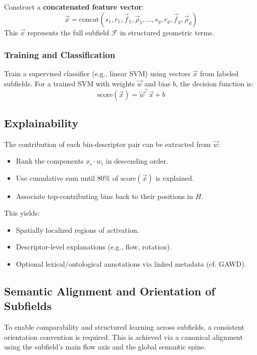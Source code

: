             Construct a \textbf{concatenated feature vector}:
            \[
                \vec{x} = \mathrm{concat}(s_1, r_1, \vec{f}_1, \vec{\rho}_1, \dots, s_g, r_g, \vec{f}_g, \vec{\rho}_g)
            \]
            This $\vec{x}$ represents the full subfield $\mathcal{F}$ in structured geometric terms.

        \subsubsection{Training and Classification}

            Train a supervised classifier (e.g., linear SVM) using vectors $\vec{x}$ from labeled subfields. For a trained SVM with weights $\vec{w}$ and bias $b$, the decision function is:
            \[
                \mathrm{score}(\vec{x}) = \vec{w}^\top \vec{x} + b
            \]

    \subsection{Explainability}

        The contribution of each bin-descriptor pair can be extracted from $\vec{w}$:
        \begin{itemize}
            \item Rank the components $x_i \cdot w_i$ in descending order.
            \item Use cumulative sum until 80\% of $\mathrm{score}(\vec{x})$ is explained.
            \item Associate top-contributing bins back to their positions in $H$.
        \end{itemize}

        This yields:
        \begin{itemize}
            \item Spatially localized regions of activation.
            \item Descriptor-level explanations (e.g., flow, rotation).
            \item Optional lexical/ontological annotations via linked metadata (cf. GAWD).
        \end{itemize}

    \subsection{Semantic Alignment and Orientation of Subfields}

        To enable comparability and structured learning across subfields, a consistent orientation convention is required. This is achieved via a canonical alignment using the subfield’s main flow axis and the global semantic spine.

